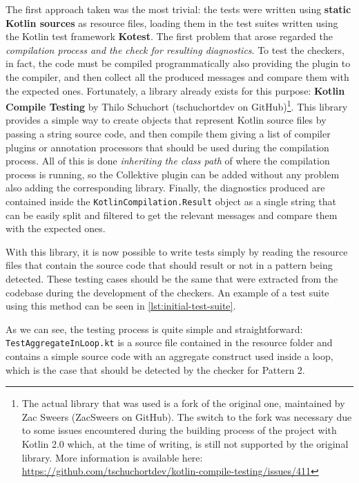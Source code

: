 \documentclass[12pt,a4paper,openright,twoside]{book}
\begin{document}
The first approach taken was the most trivial: the tests were written using
\textbf{static Kotlin sources} as resource files, loading them in the test
suites written using the Kotlin test framework \textbf{Kotest}. The first
problem that arose regarded the \emph{compilation process and the check for
resulting diagnostics}. To test the checkers, in fact, the code must be compiled
programmatically also providing the plugin to the compiler, and then collect all
the produced messages and compare them with the expected ones.
%
Fortunately, a library already exists for this purpose: \textbf{Kotlin Compile
Testing} by Thilo Schuchort (tschuchortdev on GitHub)\footnote{The actual
library that was used is a fork of the original one, maintained by Zac Sweers
(ZacSweers on GitHub). The switch to the fork was necessary due to some issues
encountered during the building process of the project with Kotlin 2.0 which,
at the time of writing, is still not supported by the original library. More
information is available here:
\url{https://github.com/tschuchortdev/kotlin-compile-testing/issues/411}}.
This library provides a simple way to create objects that represent Kotlin source
files by passing a string source code, and then compile them giving a list of
compiler plugins or annotation processors that should be used during the
compilation process. All of this is done \emph{inheriting the class path} of
where the compilation process is running, so the Collektive plugin can be added
without any problem also adding the corresponding library. Finally, the
diagnostics produced are contained inside the
\lstinline{KotlinCompilation.Result} object as a single string that can be
easily split and filtered to get the relevant messages and compare them with the
expected ones.

With this library, it is now possible to write tests simply by reading the
resource files that contain the source code that should result or not in a
pattern being detected. These testing cases should be the same that were
extracted from the codebase during the development of the checkers. An example
of a test suite using this method can be seen in \cref{lst:initial-test-suite}.
%

%
As we can see, the testing process is quite simple and straightforward:
\lstinline{TestAggregateInLoop.kt} is a source file contained in the resource
folder and contains a simple source code with an aggregate construct used inside
a loop, which is the case that should be detected by the checker for Pattern 2.
\end{document}
